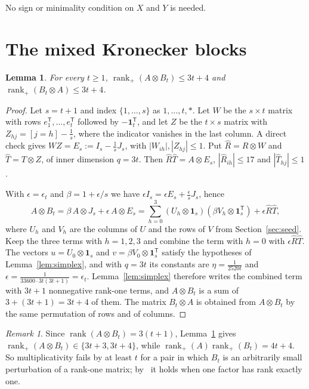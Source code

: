 \documentclass[11pt]{article}
\newtheorem{lemma}{Lemma}
\theoremstyle{remark}
\newtheorem{remark}{Remark}
\newcommand{\rk}{\operatorname{rank}}
\newcommand{\rp}{\operatorname{rank}_+}
\newcommand{\one}{\mathbf{1}}
\begin{document}
No sign or minimality condition on $X$ and $Y$ is needed.

\section{The mixed Kronecker blocks}\label{sec:mixed}

\begin{lemma}\label{lem:mixed}
For every $t\ge1$, $\rp(A\otimes B_t)\le3t+4$ and $\rp(B_t\otimes A)\le3t+4$.
\end{lemma}

\begin{proof}
Let $s=t+1$ and index $\{1,\dots,s\}$ as $1,\dots,t,*$. Let $W$ be the $s\times t$ matrix with rows $e_1^{\mathsf T},\dots,e_t^{\mathsf T}$ followed by $-\one_t^{\mathsf T}$, and let $Z$ be the $t\times s$ matrix with $Z_{hj}=[j=h]-\frac1s$, where the indicator vanishes in the last column. A direct check gives $WZ=E_s:=I_s-\frac1sJ_s$, with $|W_{ih}|,|Z_{hj}|\le1$. Put $\widehat R=R\otimes W$ and $\widehat T=T\otimes Z$, of inner dimension $q=3t$. Then $\widehat R\widehat T=A\otimes E_s$, $|\widehat R_{ih}|\le17$ and $|\widehat T_{hj}|\le1$.

With $\epsilon=\epsilon_t$ and $\beta=1+\epsilon/s$ we have $\epsilon I_s=\epsilon E_s+\frac{\epsilon}{s}J_s$, hence
\[
A\otimes B_t=\beta\,A\otimes J_s+\epsilon\,A\otimes E_s=\sum_{h=0}^{3}(U_h\otimes\one_s)(\beta V_h\otimes\one_s^{\mathsf T})+\epsilon\widehat R\widehat T,
\]
where $U_h$ and $V_h$ are the columns of $U$ and the rows of $V$ from Section~\ref{sec:seed}. Keep the three terms with $h=1,2,3$ and combine the term with $h=0$ with $\epsilon\widehat R\widehat T$. The vectors $u=U_0\otimes\one_s$ and $v=\beta V_0\otimes\one_s^{\mathsf T}$ satisfy the hypotheses of Lemma~\ref{lem:simplex}, and with $q=3t$ its constants are $\eta=\frac{1}{2520t}$ and $\epsilon=\frac{1}{33600\cdot3t(3t+1)}=\epsilon_t$. Lemma~\ref{lem:simplex} therefore writes the combined term with $3t+1$ nonnegative rank-one terms, and $A\otimes B_t$ is a sum of $3+(3t+1)=3t+4$ of them. The matrix $B_t\otimes A$ is obtained from $A\otimes B_t$ by the same permutation of rows and of columns.
\end{proof}

\begin{remark}
Since $\rk(A\otimes B_t)=3(t+1)$, Lemma~\ref{lem:mixed} gives $\rp(A\otimes B_t)\in\{3t+3,3t+4\}$, while $\rp(A)\rp(B_t)=4t+4$. So multiplicativity fails by at least $t$ for a pair in which $B_t$ is an arbitrarily small perturbation of a rank-one matrix; by~\cite[Theorem~1.3]{CC} it holds when one factor has rank exactly one.
\end{remark}
\end{document}
